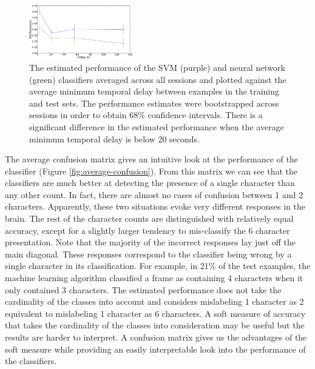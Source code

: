 \documentclass[review,1p,authoryear]{elsarticle}
\begin{document}
\begin{figure}
\centering
\includegraphics[width=0.4\textwidth]{figures/performance-verse-temporal-distance}
\caption{The estimated performance of the SVM (purple) and neural network (green) classifiers averaged across all sessions and plotted against the average minimum temporal delay between examples in the training and test sets. 
The performance estimates were bootstrapped across sessions in order to obtain 68\% confidence intervals.
There is a significant difference in the estimated performance when the average minimum temporal delay is below 20 seconds.}
\label{fig:performance-verse-temporal-distance}
\end{figure}

The average confusion matrix gives an intuitive look at the performance of the classifier (Figure \ref{fig:average-confusion}).
From this matrix we can see that the classifiers are much better at detecting the presence of a single character than any other count.
In fact, there are almost no cases of confusion between 1 and 2 characters.
Apparently, these two situations evoke very different responses in the brain.
The rest of the character counts are distinguished with relatively equal accuracy,
except for a slightly larger tendency to mis-classify the 6 character presentation.
Note that the majority of the incorrect responses lay just off the main diagonal.
These responses correspond to the classifier being wrong by a single character in its classification.
For example, in 21\% of the test examples, the machine learning algorithm classified a frame as containing 4 characters when it only contained 3 characters.
The estimated performance does not take the cardinality of the classes into account and considers mislabeling 1 character as 2 equivalent to mislabeling 1 character as 6 characters.
A soft measure of accuracy that takes the cardinality of the classes into consideration may be useful but the results are harder to interpret.
A confusion matrix gives us the advantages of the soft measure while providing an easily interpretable look into the performance of the classifiers.
\end{document}
